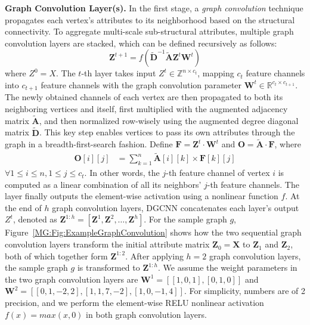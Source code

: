 \textbf{Graph Convolution Layer(s).} In the first stage, a \textit{graph convolution} technique propagates each vertex's attributes to its neighborhood based on the structural connectivity.
To aggregate multi-scale sub-structural attributes, multiple graph
convolution layers are stacked, which can be defined recursively as follows:
\begin{equation}
    \mathbf{Z}^{t + 1} = f(\tilde{\mathbf{D}}^{-1} \tilde{\mathbf{A}} \mathbf{Z}^t \mathbf{W}^t)
\end{equation}
where $Z^0 = X$. The $t$-th layer takes input $Z^t \in \mathbb{Z}^{n \times c_t}$,
mapping $c_t$ feature channels into $c_{t+1}$ feature channels with the graph convolution parameter $\mathbf{W}^t \in \mathbb{R}^{c_t \times c_{t+1}}$.
The newly obtained channels of each vertex are then propagated to both its neighboring vertices and itself,
 first multiplied with the augmented adjacency matrix $\tilde{\mathbf{A}}$,
and then normalized row-wisely using the augmented degree diagonal matrix $\tilde{\mathbf{D}}$.
This key step enables vertices to pass its own attributes through the graph in a breadth-first-search fashion. %
Define $\mathbf{F} = \mathbf{Z}^t \cdot \mathbf{W}^t$ and $\mathbf{O} = \tilde{\mathbf{A}} \cdot \mathbf{F}$, where
\begin{align}
    \mathbf{O}[i][j] &= \sum_{k = 1}^{n} \tilde{\mathbf{A}}[i][k] \times \mathbf{F}[k][j]
\end{align}
$\forall 1\leq i \leq n, 1 \leq j \leq c_t$.
In other words, the $j$-th feature channel of vertex $i$ is computed as a linear combination of all its neighbors' $j$-th feature channels.
The layer finally outputs the element-wise activation using a nonlinear function $f$.
At the end of $h$ graph convolution layers, DGCNN concatenates each layer's output $Z^{t}$,
denoted as $\mathbf{Z}^{1:h} = [\mathbf{Z}^1, \mathbf{Z}^2, \ldots, \mathbf{Z}^{h}]$.
For the sample graph $g$, Figure~\ref{MG:Fig:ExampleGraphConvolution} shows how the two sequential graph convolution layers transform the initial attribute matrix $\mathbf{Z}_0=\mathbf{X}$ to $\mathbf{Z}_1$ and $\mathbf{Z}_2$, both of which together form $\mathbf{Z}^{1:2}$.
After applying $h=2$ graph convolution layers, the sample graph $g$ is transformed to $\mathbf{Z}^{1:h}$.
We assume the weight parameters in the two graph convolution layers are $\mathbf{W}^1 = [[1, 0 ,1], [0, 1, 0]]$ and $\mathbf{W}^2 = [[0, 1 ,-2, 2], [1, 1, 7, -2], [1, 0, -1, 4]]$.
For simplicity, numbers are of 2 precision, and we perform the element-wise RELU nonlinear activation $f(x) = max(x, 0)$ in both graph convolution layers.

